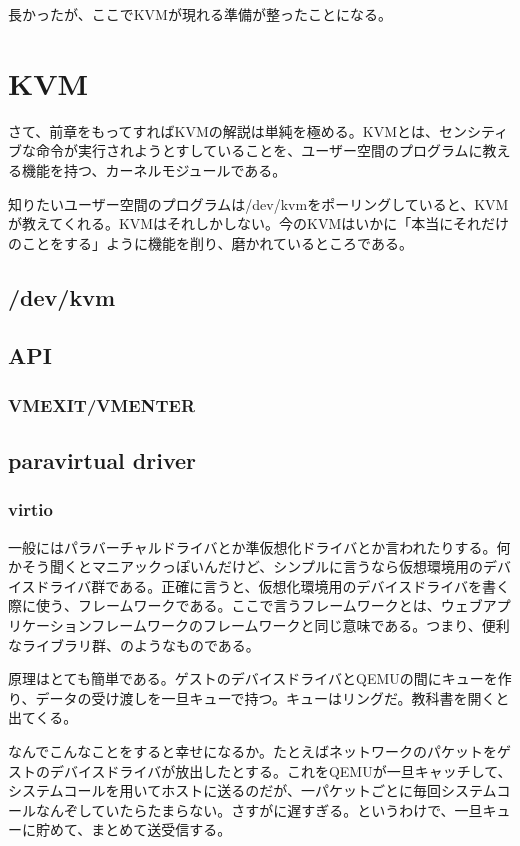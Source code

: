 \documentclass[9pt,b5paper,tombo]{jsbook}
\begin{document}
長かったが、ここでKVMが現れる準備が整ったことになる。

\section{KVM}

さて、前章をもってすればKVMの解説は単純を極める。KVMとは、センシティブな命令が実行されようとすしていることを、ユーザー空間のプログラムに教える機能を持つ、カーネルモジュールである。

知りたいユーザー空間のプログラムは/dev/kvmをポーリングしていると、KVMが教えてくれる。KVMはそれしかしない。今のKVMはいかに「本当にそれだけのことをする」ように機能を削り、磨かれているところである。

\subsection{/dev/kvm}

\subsection{API}

\subsubsection{VMEXIT/VMENTER}

\subsection{paravirtual driver}

\subsubsection{virtio}

一般にはパラバーチャルドライバとか準仮想化ドライバとか言われたりする。何かそう聞くとマニアックっぽいんだけど、シンプルに言うなら仮想環境用のデバイスドライバ群である。正確に言うと、仮想化環境用のデバイスドライバを書く際に使う、フレームワークである。ここで言うフレームワークとは、ウェブアプリケーションフレームワークのフレームワークと同じ意味である。つまり、便利なライブラリ群、のようなものである。

原理はとても簡単である。ゲストのデバイスドライバとQEMUの間にキューを作り、データの受け渡しを一旦キューで持つ。キューはリングだ。教科書を開くと出てくる。

なんでこんなことをすると幸せになるか。たとえばネットワークのパケットをゲストのデバイスドライバが放出したとする。これをQEMUが一旦キャッチして、システムコールを用いてホストに送るのだが、一パケットごとに毎回システムコールなんぞしていたらたまらない。さすがに遅すぎる。というわけで、一旦キューに貯めて、まとめて送受信する。
\end{document}
